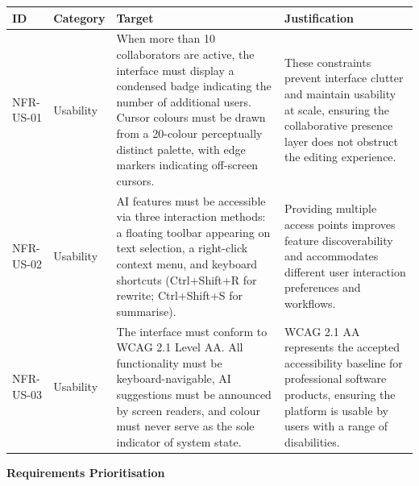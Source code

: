 \documentclass{article}
\begin{document}
\noindent
{\small
\begin{tabularx}{\textwidth}{|>{\hsize=0.3\hsize\raggedright\arraybackslash}X|>{\hsize=0.3\hsize\raggedright\arraybackslash}X|>{\hsize=1\hsize\raggedright\arraybackslash}X|>{\hsize=1.4\hsize\raggedright\arraybackslash}X|}
    \hline
    \rowcolor{tableBlue} 
    \textbf{\color{white}ID} & 
    \textbf{\color{white}Category} & 
    \textbf{\color{white}Target} & 
    \textbf{\color{white}Justification} \\
    \hline
    NFR-US-01 & Usability &
    When more than 10 collaborators are active, the interface must display a condensed badge indicating the number of additional users. Cursor colours must be drawn from a 20-colour perceptually distinct palette, with edge markers indicating off-screen cursors. &
    These constraints prevent interface clutter and maintain usability at scale, ensuring the collaborative presence layer does not obstruct the editing experience. \\
    \hline
    NFR-US-02 & Usability &
    AI features must be accessible via three interaction methods: a floating toolbar appearing on text selection, a right-click context menu, and keyboard shortcuts (Ctrl+Shift+R for rewrite; Ctrl+Shift+S for summarise). &
    Providing multiple access points improves feature discoverability and accommodates different user interaction preferences and workflows. \\
    \hline
    NFR-US-03 & Usability &
    The interface must conform to WCAG 2.1 Level AA. All functionality must be keyboard-navigable, AI suggestions must be announced by screen readers, and colour must never serve as the sole indicator of system state. &
    WCAG 2.1 AA represents the accepted accessibility baseline for professional software products, ensuring the platform is usable by users with a range of disabilities. \\
    \hline
\end{tabularx}
}

\noindent\textbf{Requirements Prioritisation}
\vspace{5pt}
\end{document}
